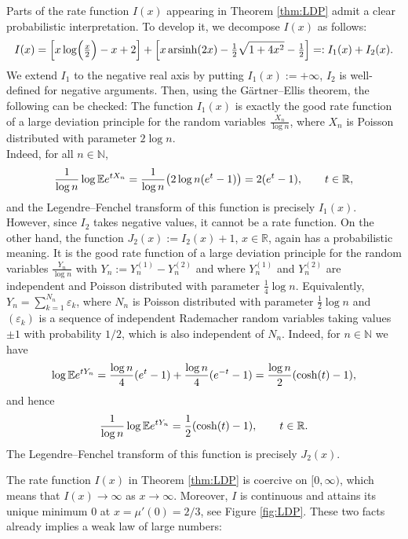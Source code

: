 \documentclass[11pt,a4paper]{article}
\numberwithin{equation}{section}
\def\EE{\mathbb{E}}
\def\NN{\mathbb{N}}
\def\RR{\mathbb{R}}
\def\arsinh{\mathrm{arsinh}}
\begin{document}
Parts of the rate function $I(x)$ appearing in Theorem \ref{thm:LDP} admit a clear probabilistic interpretation. To develop it, we decompose $I(x)$ as follows:
$$
I(x) = \Big[x\log\Bigl(\tfrac{x}{2}\Bigr)-x+2\Big] + \Big[x\,\arsinh(2x)-\tfrac{1}{2}\sqrt{1+4x^2} -\tfrac{1}{2}\Big] =: I_1(x) + I_2(x).
$$
We extend $I_1$ to the negative real axis by putting $I_1(x):=+\infty$, $I_2$ is well-defined for negative arguments. Then, using the Gärtner--Ellis theorem, the following can be checked: The function $I_1(x)$ is exactly the good rate function of a large deviation principle for the random variables $\tfrac{X_n}{\log n}$, where $X_n$ is Poisson distributed with parameter $2\log n$.\\ Indeed, for all $n\in\NN$,
$$
{1\over\log n}\log\EE e^{tX_n} = {1\over\log n}\big(2\log n(e^t-1)\big) = 2(e^t-1),\qquad t\in\RR,
$$
and the Legendre--Fenchel transform of this function is precisely $I_1(x)$. However, since $I_2$ takes negative values, it cannot be a rate function. On the other hand, the function $J_2(x):=I_2(x)+1$, $x\in\RR$, again has a probabilistic meaning. It is the good rate function of a large deviation principle for the random variables $\tfrac{Y_n}{\log n}$ with $Y_n:=Y_n^{(1)}-Y_n^{(2)}$ and where $Y_n^{(1)}$ and $Y_n^{(2)}$ are independent and Poisson distributed with parameter $\tfrac{1}{4}\log n$. Equivalently, $Y_n=\sum_{k=1}^{N_n}\varepsilon_k$, where $N_n$ is Poisson distributed with parameter $\tfrac{1}{2}\log n$ and $(\varepsilon_k)$ is a sequence of independent Rademacher random variables taking values $\pm 1$ with probability $1/2$, which is also independent of $N_n$. Indeed, for $n\in\NN$ we have
    $$
    \log\EE e^{tY_n} = {\log n\over 4}(e^t-1) +{\log n\over 4}(e^{-t}-1) = {\log n\over 2}(\cosh(t)-1),
    $$
    and hence
    $$
    {1\over\log n}\log\EE e^{tY_n} = {1\over 2}(\cosh(t) -1),\qquad t\in\RR.
    $$
    The Legendre--Fenchel transform of this function is precisely $J_2(x)$.


\medskip


The rate function $I(x)$ in Theorem \ref{thm:LDP} is coercive on $[0,\infty)$, which means that $I(x)\to\infty$ as $x\to\infty$. Moreover, $I$ is continuous and attains its unique minimum $0$ at $x=\mu'(0)=2/3$, see Figure \ref{fig:LDP}. These two facts already implies a weak law of large numbers:
\end{document}
